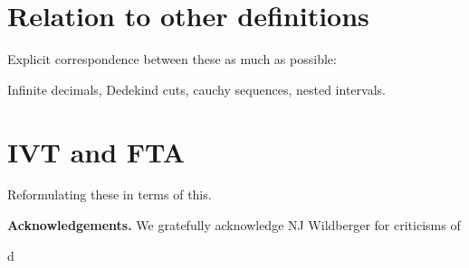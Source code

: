 \documentclass[12pt]{article}
\begin{document}
\section{Relation to other definitions}

Explicit correspondence between these as much as possible: 

Infinite decimals, Dedekind cuts, cauchy sequences, nested intervals. 

\section{IVT and FTA}

Reformulating these in terms of this. 





\bigskip

\noindent \textbf{Acknowledgements. } We gratefully acknowledge NJ Wildberger for criticisms of 

\begin{thebibliography}{28.}
d

\end{thebibliography}
\end{document}
